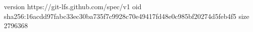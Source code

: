 version https://git-lfs.github.com/spec/v1
oid sha256:16acdd97fabc33ec30ba735f7c9928c70e49417fd48e0c985bf20274d5feb4f5
size 2796368
